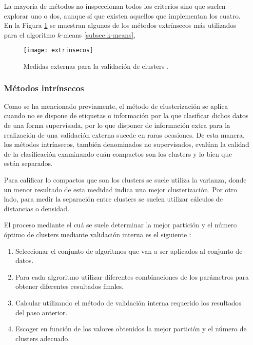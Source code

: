 \documentclass[10pt, a4paper]{article}
\begin{document}
La mayoría de métodos no inspeccionan todos los criterios sino que suelen explorar uno o dos, aunque sí que existen aquellos que implementan los cuatro. En la Figura \ref{fig:extrinsecos} se muestran algunos de los métodos extrínsecos más utilizados para el algoritmo $k$-means \ref{subsec:k-means},

\begin{figure}[ht]
\centering
\texttt{[image: extrinsecos]}
\caption{Medidas externas para la validación de clusters \cite{otrolibro}.}
\label{fig:extrinsecos}
\end{figure}
  

\subsubsection{\textbf{Métodos intrínsecos}} 

Como se ha mencionado previamente, el método de clusterización se aplica cuando no se dispone de etiquetas o información por la que clasificar dichos datos de una forma supervisada, por lo que disponer de información extra para la realización de una validación externa sucede en raras ocasiones. De esta manera, los métodos intrínsecos, también denominados no supervisados, evalúan la calidad de la clasificación examinando cuán compactos son los clusters y lo bien que están separados.

Para calificar lo compactos que son los clusters se suele utiliza la varianza, donde un menor resultado de esta medidad indica una mejor clusterización. Por otro lado, para medir la separación entre clusters se suelen utilizar cálculos de distancias o densidad.

El proceso mediante el cuá se suele determinar la mejor partición y el número óptimo de clusters mediante validación interna es el siguiente \cite{otrolibro}:

\begin{enumerate}
  \item Seleccionar el conjunto de algoritmos que van a ser aplicados al conjunto de datos.
  \item Para cada algroritmo utilizar diferentes combinaciones de los parámetros para obtener diferentes resultados finales.
  \item Calcular utilizando el método de validación interna requerido los resultados del paso anterior.
  \item Escoger en función de los valores obtenidos la mejor partición y el número de clusters adecuado.
\end{enumerate}
\end{document}
